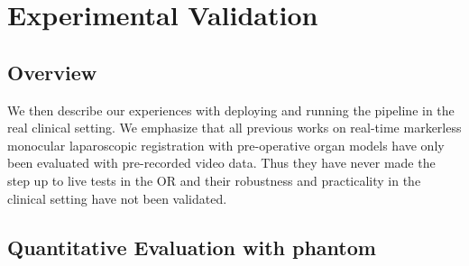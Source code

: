 \section{Experimental Validation}
\label{sec:experiments}
\subsection{Overview}
We then describe our experiences with deploying and running the pipeline in the real clinical setting.
We emphasize that all previous works on real-time markerless monocular laparoscopic registration with pre-operative organ models have only been evaluated with pre-recorded video data.
Thus they have never made the step up to live tests in the OR and their robustness and practicality in the clinical setting have not been validated.

\subsection{Quantitative Evaluation with phantom}
\label{subsec:quantitative-evaluation-with-phantom}

